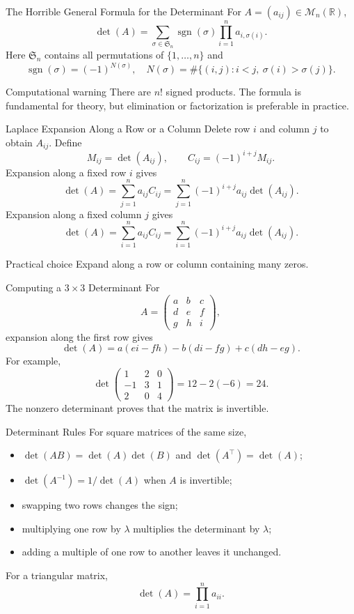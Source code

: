\documentclass[aspectratio=169]{beamer}
\newcommand{\R}{\mathbb{R}}
\newcommand{\M}{\mathcal{M}}
\begin{document}
\begin{frame}{The Horrible General Formula for the Determinant}
For $A=(a_{ij})\in\M_n(\R)$,
\[
\boxed{\det(A)=\sum_{\sigma\in\mathfrak S_n}
\operatorname{sgn}(\sigma)\prod_{i=1}^n a_{i,\sigma(i)}}.
\]
\pause
Here $\mathfrak S_n$ contains all permutations of $\{1,\ldots,n\}$ and
\[
\operatorname{sgn}(\sigma)=(-1)^{N(\sigma)},
\quad
N(\sigma)=\#\{(i,j):i<j,\ \sigma(i)>\sigma(j)\}.
\]
\begin{alertblock}{Computational warning}
There are $n!$ signed products. The formula is fundamental for theory, but
elimination or factorization is preferable in practice.
\end{alertblock}
\end{frame}

\begin{frame}{Laplace Expansion Along a Row or a Column}
Delete row $i$ and column $j$ to obtain $A_{ij}$. Define
\[
M_{ij}=\det(A_{ij}),
\qquad
C_{ij}=(-1)^{i+j}M_{ij}.
\]
\pause
Expansion along a fixed row $i$ gives
\[
\boxed{\det(A)=\sum_{j=1}^n a_{ij}C_{ij}}
=\sum_{j=1}^n(-1)^{i+j}a_{ij}\det(A_{ij}).
\]
Expansion along a fixed column $j$ gives
\[
\boxed{\det(A)=\sum_{i=1}^n a_{ij}C_{ij}}
=\sum_{i=1}^n(-1)^{i+j}a_{ij}\det(A_{ij}).
\]
\begin{block}{Practical choice}
Expand along a row or column containing many zeros.
\end{block}
\end{frame}

\begin{frame}{Computing a $3\times3$ Determinant}
For
\[
A=\begin{pmatrix}a&b&c\\d&e&f\\g&h&i\end{pmatrix},
\]
expansion along the first row gives
\[
\det(A)=a(ei-fh)-b(di-fg)+c(dh-eg).
\]
\pause
For example,
\[
\det\begin{pmatrix}1&2&0\\-1&3&1\\2&0&4\end{pmatrix}
=12-2(-6)=24.
\]
The nonzero determinant proves that the matrix is invertible.
\end{frame}

\begin{frame}{Determinant Rules}
For square matrices of the same size,
\begin{itemize}
  \item $\det(AB)=\det(A)\det(B)$ and $\det(A^\top)=\det(A)$;
  \item $\det(A^{-1})=1/\det(A)$ when $A$ is invertible;
  \item swapping two rows changes the sign;
  \item multiplying one row by $\lambda$ multiplies the determinant by $\lambda$;
  \item adding a multiple of one row to another leaves it unchanged.
\end{itemize}
\pause
For a triangular matrix,
\[
\det(A)=\prod_{i=1}^n a_{ii}.
\]
\end{frame}
\end{document}
